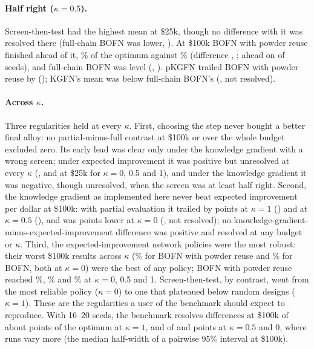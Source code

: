\documentclass[11pt]{article}
\begin{document}
\paragraph{Half right ($\kappa=0.5$).} Screen-then-test had the highest mean at
\$25k, though no difference with it was resolved there (full-chain BOFN was
\pp{} lower, ). At
\$100k BOFN with powder reuse finished ahead of it, \%
of the optimum against \% (difference
\pp, ;
ahead on  of  seeds), and
full-chain BOFN was level (\pp,
). pKGFN trailed BOFN with powder reuse by
\pp{} (); KGFN's mean was
\pp{} below full-chain BOFN's (,
not resolved).

\paragraph{Across $\kappa$.} Three regularities held at every $\kappa$.
First, choosing the step never bought a better final alloy: no partial-minus-full
contrast at \$100k or over the whole budget excluded zero. Its early lead was
clear only under the knowledge gradient with a wrong screen; under expected
improvement it was positive but unresolved at every $\kappa$ (,
 and \pp{} at \$25k for $\kappa=0$, 0.5
and 1), and under the knowledge gradient it was negative, though unresolved, when
the screen was at least half right. Second, the knowledge gradient as implemented here never beat expected
improvement per dollar at \$100k: with partial evaluation it trailed by
 points at $\kappa=1$ () and
 at $\kappa=0.5$ (), and was
 points lower at $\kappa=0$ (, not
resolved); no knowledge-gradient-minus-expected-improvement difference was
positive and resolved at any budget or $\kappa$. Third, the expected-improvement network policies were the most robust: their
worst \$100k results across $\kappa$ (\% for BOFN
with powder reuse and \% for BOFN, both at $\kappa=0$)
were the best of any policy; BOFN with powder reuse reached
\%, \% and
\% at $\kappa=0$, 0.5 and 1. Screen-then-test, by contrast, went from the most reliable policy
($\kappa=0$) to one that plateaued below random designs ($\kappa=1$). These are
the regularities a user of the benchmark should expect to reproduce. With 16--20
seeds, the benchmark resolves differences at \$100k of about
 points of the optimum at $\kappa=1$, and of
 and  points at $\kappa=0.5$
and 0, where runs vary more (the median half-width of a pairwise 95\% interval at
\$100k).
\end{document}
